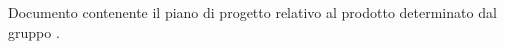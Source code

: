 Documento contenente il piano di progetto relativo al prodotto \textit{\progetto} determinato dal gruppo \textit{\gruppo}.

